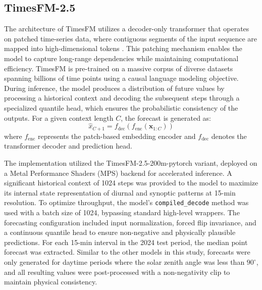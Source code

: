 \documentclass[number, 3p, 10pt, times]{elsarticle}
\begin{document}
\subsection{TimesFM-2.5}
The architecture of TimesFM utilizes a decoder-only transformer that operates on patched time-series data, where contiguous segments of the input sequence are mapped into high-dimensional tokens \citep{Das2024}. This patching mechanism enables the model to capture long-range dependencies while maintaining computational efficiency. TimesFM is pre-trained on a massive corpus of diverse datasets spanning billions of time points using a causal language modeling objective. During inference, the model produces a distribution of future values by processing a historical context and decoding the subsequent steps through a specialized quantile head, which ensures the probabilistic consistency of the outputs. For a given context length $C$, the forecast is generated as:
\begin{equation}
    \hat{x}_{C+1} = f_\text{dec}(f_\text{enc}(\mathbf{x}_{1:C}))
\end{equation}
where $f_\text{enc}$ represents the patch-based embedding encoder and $f_\text{dec}$ denotes the transformer decoder and prediction head. 

The implementation utilized the TimesFM-2.5-200m-pytorch variant, deployed on a Metal Performance Shaders (MPS) backend for accelerated inference. A significant historical context of 1024 steps was provided to the model to maximize its internal state representation of diurnal and synoptic patterns at 15-min resolution. To optimize throughput, the model's \texttt{compiled\_decode} method was used with a batch size of 1024, bypassing standard high-level wrappers. The forecasting configuration included input normalization, forced flip invariance, and a continuous quantile head to ensure non-negative and physically plausible predictions. For each 15-min interval in the 2024 test period, the median point forecast was extracted. Similar to the other models in this study, forecasts were only generated for daytime periods where the solar zenith angle was less than $90^\circ$, and all resulting values were post-processed with a non-negativity clip to maintain physical consistency.
\end{document}
